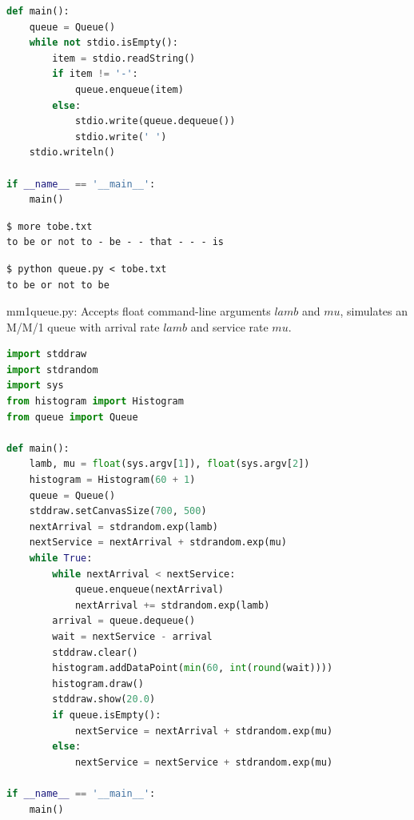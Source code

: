 \documentclass[8pt,a4paper,compress,handout]{beamer}
\begin{document}
\begin{frame}[fragile]
\begin{lstlisting}[language=Python]
def main():
    queue = Queue()
    while not stdio.isEmpty():
        item = stdio.readString()
        if item != '-':
            queue.enqueue(item)
        else:
            stdio.write(queue.dequeue())
            stdio.write(' ')
    stdio.writeln()

if __name__ == '__main__':
    main()
\end{lstlisting}

\begin{lstlisting}[language={}]
$ more tobe.txt
to be or not to - be - - that - - - is
\end{lstlisting}

\begin{lstlisting}[language={}]
$ python queue.py < tobe.txt
to be or not to be
\end{lstlisting}
\end{frame}

\begin{frame}[fragile]
\begin{framed}
\tiny mm1queue.py: Accepts float command-line arguments $lamb$ and $mu$, simulates an M/M/1 queue with arrival rate $lamb$ and service rate $mu$.
\end{framed}

\begin{lstlisting}[language=Python]
import stddraw
import stdrandom
import sys
from histogram import Histogram
from queue import Queue

def main():
    lamb, mu = float(sys.argv[1]), float(sys.argv[2])
    histogram = Histogram(60 + 1)
    queue = Queue()
    stddraw.setCanvasSize(700, 500)
    nextArrival = stdrandom.exp(lamb)
    nextService = nextArrival + stdrandom.exp(mu) 
    while True:
        while nextArrival < nextService:
            queue.enqueue(nextArrival)
            nextArrival += stdrandom.exp(lamb)
        arrival = queue.dequeue()
        wait = nextService - arrival
        stddraw.clear()
        histogram.addDataPoint(min(60, int(round(wait))))
        histogram.draw()
        stddraw.show(20.0)
        if queue.isEmpty():
            nextService = nextArrival + stdrandom.exp(mu)
        else:
            nextService = nextService + stdrandom.exp(mu)

if __name__ == '__main__':
    main()

\end{lstlisting}
\end{frame}
\end{document}
